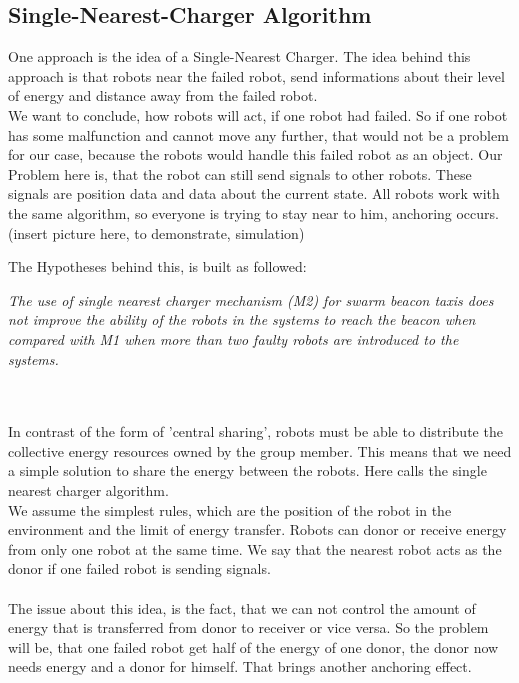 \documentclass[
	a4paper,
	article,
	pagesize,
	pdftex,
	12pt,
	english,
	fleqn,
	final,
	]{scrartcl}
\begin{document}
\subsection{Single-Nearest-Charger Algorithm}
One approach is the idea of a Single-Nearest Charger.
The idea behind this approach is that robots near the failed robot, send informations about their level of energy and distance away from the failed robot.\\
We want to conclude, how robots will act, if one robot had failed. So if one robot has some malfunction and cannot move any further, that would not be a problem for our case, because the robots would handle this failed robot as an object. Our Problem here is, that the robot can still send signals to other robots. These signals are position data and data about the current state. All robots work with the same algorithm, so everyone is trying to stay near to him, anchoring occurs. \\

(insert picture here, to demonstrate, simulation)\\
\begin{minipage}[c][3cm]{\textwidth}
	The Hypotheses behind this, is built as followed:
	\begin{displayquote}
		\textit{The use of single nearest charger mechanism (M2) for swarm beacon
		taxis does not improve the ability of the robots in the systems to
		reach the beacon when compared with M1 when more than two faulty
		robots are introduced to the systems.}
	\end{displayquote}
\end{minipage}\\
\ \\
In contrast of the form of 'central sharing', robots must be able to distribute the collective energy resources owned by the group member. This means that we need a simple solution to share the energy between the robots. Here calls the single nearest charger algorithm.\\
We assume the simplest rules, which are the position of the robot in the environment and the limit of energy transfer. Robots can donor or receive energy from only one robot at the same time. We say that the nearest robot acts as the donor if one failed robot is sending signals.\\
\ \\
The issue about this idea, is the fact, that we can not control the amount of energy that is transferred from donor to receiver or vice versa. So the problem will be, that one failed robot get half of the energy of one donor, the donor now needs energy and a donor for himself. That brings another anchoring effect.
\end{document}
